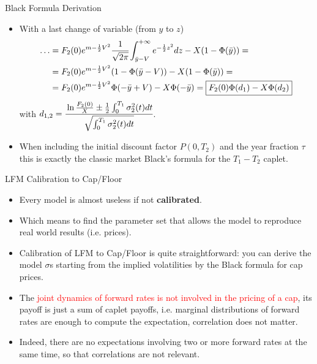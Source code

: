 \documentclass{beamer}
\begin{document}
\begin{frame}{Black Formula Derivation}
\begin{itemize}
\item With a last change of variable (from $y$ to $z$)
\begin{equation*}
\begin{aligned}
\ldots 
&=F_2(0)e^{m-\frac{1}{2}V^2}\cfrac{1}{\sqrt{2\pi}}\int_{\bar{y}-V}^{+\infty}e^{-\frac{1}{2}z^2}dz-X(1-\Phi(\bar{y})) = \\
&= F_2(0)e^{m-\frac{1}{2}V^2}(1-\Phi(\bar{y}-V))-X(1-\Phi(\bar{y})) = \\
&= F_2(0)e^{m-\frac{1}{2}V^2}\Phi(-\bar{y}+V)-X\Phi(-\bar{y}) = \boxed{F_2(0)\Phi(d_1)-X\Phi(d_2)}
\end{aligned}
\end{equation*}
with $d_{1,2}=\cfrac{\ln\frac{F_2(0)}{X}\pm\frac{1}{2}\int_0^{T_1}\sigma^2_2(t)dt}{\sqrt{\int_0^{T_1}\sigma_2^2(t)dt}}$.
\item When including the initial discount factor $P(0, T_2)$ and the year fraction $\tau$ this is exactly the classic market Black’s formula for the $T_1 - T_2$ caplet.
\end{itemize}
\end{frame}

\begin{frame}{LFM Calibration to Cap/Floor}
\begin{itemize}
	\item<1-> Every model is almost useless if not \textbf{calibrated}. 
	\item Which means to find the parameter set that allows the model to reproduce real world results (i.e. prices).
	\item<2-> Calibration of LFM to Cap/Floor is quite straightforward: you can derive the model $\sigma$s starting from the implied volatilities by the Black formula for cap prices.
	\item<3-> The \textcolor{red}{joint dynamics of forward rates is not involved in the pricing of a cap}, its payoff is just a sum of caplet payoffs, i.e. marginal distributions of forward rates are enough to compute the expectation, correlation does not matter. 
	\item<4-> Indeed, there are no expectations involving two or more forward rates at the same time, so that correlations are not relevant.
\end{itemize}
\end{frame}
\end{document}
